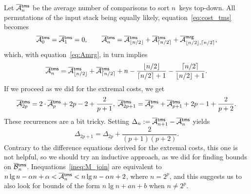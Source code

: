 Let \(\OM{\fun{tms}}{n}\) be the
average number of comparisons to sort \(n\)~keys top\hyp{}down. All
permutations of the input stack being equally likely,
equation~\eqref{eq:cost_tms} becomes
\begin{equation*}
\OM{\fun{tms}}{0} = \OM{\fun{tms}}{1} = 0,\qquad
\OM{\fun{tms}}{n} = \OM{\fun{tms}}{\floor{n/2}} +
\OM{\fun{tms}}{\ceiling{n/2}} +
\OM{\fun{mrg}}{\floor{n/2},\ceiling{n/2}},\index{mrg@\fun{mrg/2}}
\end{equation*}
which, with equation~\eqref{eq:Amrg}, in turn implies
\begin{equation*}
\OM{\fun{tms}}{n} = \OM{\fun{tms}}{\floor{n/2}} +
\OM{\fun{tms}}{\ceiling{n/2}} + n -
\frac{\floor{n/2}}{\ceiling{n/2}+1}
- \frac{\ceiling{n/2}}{\floor{n/2}+1}.
\end{equation*}
If we proceed as we did for the extremal costs, we get
\begin{equation*}
\OM{\fun{tms}}{2p} = 2\cdot\OM{\fun{tms}}{p} + 2p - 2 +
\frac{2}{p+1},\; \OM{\fun{tms}}{2p+1} = \OM{\fun{tms}}{p} +
\OM{\fun{tms}}{p+1} + 2p - 1 + \frac{2}{p+2}.
\end{equation*}
These recurrences are a bit tricky. Setting \(\Delta_n :=
\OM{\fun{tms}}{n+1} - \OM{\fun{tms}}{n}\) yields
\begin{equation*}
\Delta_{2p+1} = \Delta_{2p} + \frac{2}{(p+1)(p+2)}.
\end{equation*}
Contrary to the difference equations derived for the extremal costs,
this one is not helpful, so we should try an inductive approach, as we
did for finding bounds on
\(\OB{\fun{tms}}{n}\). Inequations~\eqref{ineq:M_join}
 are equivalent to \(n\lg n - \alpha n + \alpha
< \OM{\fun{tms}}{n} < n\lg n - \alpha n + 2\), where \(n = 2^p\), and
this suggests us to also look for bounds of the form \(n\lg n + an +
b\) when \(n \neq 2^p\).

